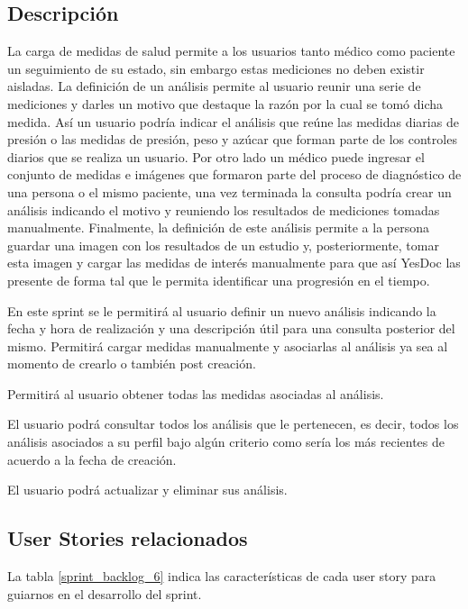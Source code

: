 \documentclass[a4paper,12pt]{article}
\begin{document}
\subsection{Descripción}

	La carga de medidas de salud permite a los usuarios tanto médico como paciente un seguimiento de su estado, sin embargo estas mediciones no deben existir aisladas. La definición de un análisis permite al usuario reunir una serie de mediciones y darles un motivo que destaque la razón por la cual se tomó dicha medida. Así un usuario podría indicar el análisis que reúne las medidas diarias de presión o las medidas de presión, peso y azúcar que forman parte de los controles diarios que se realiza un usuario. Por otro lado un médico puede ingresar el conjunto de medidas e imágenes que formaron parte del proceso de diagnóstico de una persona o el mismo paciente, una vez terminada la consulta podría crear un análisis indicando el motivo y reuniendo los resultados de mediciones tomadas manualmente. Finalmente, la definición de este análisis permite a la persona guardar una imagen con los resultados de un estudio y, posteriormente, tomar esta imagen y cargar las medidas de interés manualmente para que así YesDoc las presente de forma tal que le permita identificar una progresión en el tiempo.
	
	En este sprint se le permitirá al usuario definir un nuevo análisis indicando la fecha y hora de realización y una descripción útil para una consulta posterior del mismo. Permitirá cargar medidas manualmente y asociarlas al análisis ya sea al momento de crearlo o también post creación.
	
	Permitirá al usuario obtener todas las medidas asociadas al análisis.
	
	El usuario podrá consultar todos los análisis que le pertenecen, es decir, todos los análisis asociados a su perfil bajo algún criterio como sería los más recientes de acuerdo a la fecha de creación. 
	
	El usuario podrá actualizar y eliminar sus análisis.
	
	 

\subsection{User Stories relacionados}
La tabla \ref{sprint_backlog_6} indica las características de cada user story para guiarnos en el desarrollo del sprint.
\end{document}
